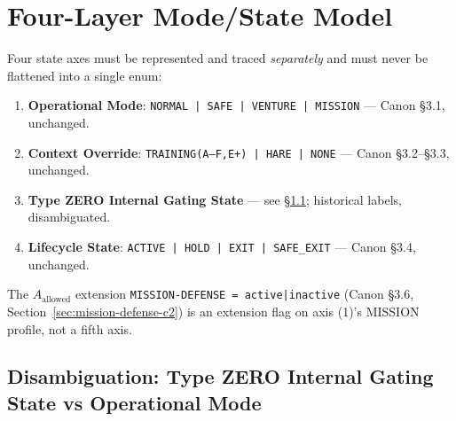 \section{Four-Layer Mode/State Model}
\label{sec:v73-four-layer}

Four state axes must be represented and traced \emph{separately} and
must never be flattened into a single enum:

\begin{enumerate}
\item \textbf{Operational Mode}: \texttt{NORMAL | SAFE | VENTURE |
MISSION} --- Canon \S3.1, unchanged.
\item \textbf{Context Override}: \texttt{TRAINING(A--F,E+) | HARE |
NONE} --- Canon \S3.2--\S3.3, unchanged.
\item \textbf{Type ZERO Internal Gating State} --- see
\S\ref{sec:v73-typezero-disambiguation}; historical labels, disambiguated.
\item \textbf{Lifecycle State}: \texttt{ACTIVE | HOLD | EXIT |
SAFE\_EXIT} --- Canon \S3.4, unchanged.
\end{enumerate}

\noindent
The $A_{\mathrm{allowed}}$ extension \texttt{MISSION-DEFENSE =
active|inactive} (Canon \S3.6, Section~\ref{sec:mission-defense-c2}) is
an extension flag on axis (1)'s MISSION profile, not a fifth axis.

\subsection{Disambiguation: Type ZERO Internal Gating State vs Operational Mode}
\label{sec:v73-typezero-disambiguation}

